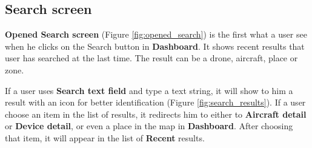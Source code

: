 \subsection{Search screen}\label{subsec:search-screen}
\textbf{Opened Search screen} (Figure \ref{fig:opened_search}) is the first what a user see when he clicks on the Search button in \textbf{Dashboard}.
It shows recent results that user has searched at the last time.
The result can be a drone, aircraft, place or zone.

If a user uses \textbf{Search text field} and type a text string, it will show to him a result with an icon for better identification (Figure \ref{fig:search_results}).
If a user choose an item in the list of results, it redirects him to either to \textbf{Aircraft detail} or \textbf{Device detail}, or even a place in the map in \textbf{Dashboard}.
After choosing that item, it will appear in the list of \textbf{Recent} results.

